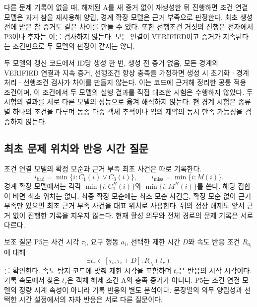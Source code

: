 \begin{revision}
다른 문제 기록이 없을 때, 해제된 A를 새 증거 없이 재생성한 뒤 진행하면 조건 연결 모델은 과거 참을 재사용해 양립, 경계 확장 모델은 근거 부족으로 판정한다. 최초 생성 전에 받은 참 증거도 같은 차이를 만들 수 있다. 또한 선행조건 거짓의 진행은 전자에서 P3이나 후자는 이를 검사하지 않는다. 모든 연결이 VERIFIED이고 증거가 지속된다는 조건만으로 두 모델의 판정이 같지는 않다.

두 모델의 갱신 코드에서 ID당 생성 한 번, 생성 전 증거 없음, 모든 경계의 VERIFIED 연결과 지속 증거, 선행조건 항상 충족을 가정하면 생성 시 초기화ㆍ경계 처리ㆍ선행조건 검사가 차이를 만들지 않는다. 이는 코드에 근거해 정리한 공통 적용 조건이며, 이 조건에서 두 모델의 실행 결과를 직접 대조한 시험은 수행하지 않았다. 두 시험의 결과를 서로 다른 모델의 성능으로 옮겨 해석하지 않는다. 현 경계 시험은 종류별 하나의 조건을 다루며 동종 다중 객체 추적이나 임의 제약의 동시 만족 가능성을 검증하지 않는다.

\subsection{최초 문제 위치와 반응 시간 질문}
\label{sec:issue-definition}
조건 연결 모델의 확정 모순과 근거 부족 최초 사건은 따로 기록한다.
\begin{equation}
 i_{\mathrm{bad}}=\min\{i:C_1(i)\lor C_3(i)\},\qquad
 i_{\mathrm{miss}}=\min\{i:M(i)\}.
\end{equation}
경계 확장 모델에서는 각각 $\min\{i:C_1^B(i)\}$와 $\min\{i:M^B(i)\}$를 쓴다. 해당 집합이 비면 최초 위치는 없다. 최종 확정 모순에는 최초 모순 사건을, 확정 모순 없이 근거 부족만 있으면 최초 근거 부족 사건을 대표 위치로 사용한다. 뒤의 정상 해제도 앞서 근거 없이 진행한 기록을 지우지 않는다. 현재 활성 의무와 전체 경로의 문제 기록은 서로 다르다.

보조 질문 P5는 사건 시각 $\tau_i$, 요구 행동 $a_i$, 선택한 제한 시간 $D$와 속도 반응 조건 $R_{a_i}$에 대해
\begin{equation}
\exists t_r\in[\tau_i,\tau_i+D]:R_{a_i}(t_r)
\label{eq:response-contract}
\end{equation}
를 확인한다. 속도 탐지 코드에 맞춰 제한 시각을 포함하며 $t_r$은 반응의 시작 시각이다. 기록 속도에서 찾은 $t_r$은 객체 해제 조건 A의 충족 증거가 아니다. P5는 조건 연결 모델의 정량 시계 속성이 아니라 기록 반응의 별도 분석이다. 문장열의 의무 양립성과 선택한 시간 설정에서의 자차 반응은 서로 다른 질문이다.
\end{revision}
